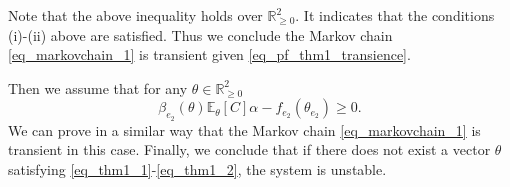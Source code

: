 Note that the above inequality holds over $\mathbb{R}_{\geq0}^2$. It indicates that the conditions (i)-(ii) above are satisfied. Thus we conclude the Markov chain \eqref{eq_markovchain_1} is transient given \eqref{eq_pf_thm1_transience}.

Then we assume that for any $\theta\in\mathbb{R}_{\geq0}^2$
\begin{equation}
    \beta_{e_2}(\theta)\mathbb{E}_\theta[C]\alpha  -f_{e_2}(\theta_{e_2}) \geq 0.
\end{equation}
We can prove in a similar way that the Markov chain \eqref{eq_markovchain_1} is transient in this case. Finally, we conclude that if there does not exist a vector $\theta$ satisfying \eqref{eq_thm1_1}-\eqref{eq_thm1_2}, the system is unstable.

